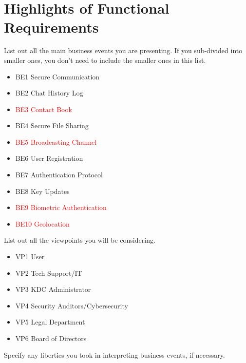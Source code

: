 \documentclass[]{article}
\begin{document}
\section{Highlights of Functional Requirements}
\label{sec:functional_requirements}

 List out all the main business events you are presenting. If you sub-divided into smaller ones, you don't need to include the smaller ones in this list.\\

\begin{itemize}
	\item BE1 Secure Communication
	\item BE2 Chat History Log
	\item[\textcolor{red}{\textbullet}] \textcolor{red}{BE3 Contact Book}
	\item BE4 Secure File Sharing
	\item[\textcolor{red}{\textbullet}] \textcolor{red}{BE5 Broadcasting Channel}
	\item BE6 User Registration
	\item BE7 Authentication Protocol
	\item BE8 Key Updates
	\item[\textcolor{red}{\textbullet}] \textcolor{red}{BE9 Biometric Authentication}
	\item[\textcolor{red}{\textbullet}] \textcolor{red}{BE10 Geolocation}

\end{itemize}

 List out all the viewpoints you will be considering.\\

\begin{itemize}
	\item VP1 User
	\item 	VP2 Tech Support/IT
	\item 	VP3 KDC Administrator
	\item 	VP4 Security Auditors/Cybersecurity
	\item 	VP5 Legal Department
	\item 	VP6 Board of Directors


\end{itemize}

 Specify any liberties you took in interpreting business events, if necessary.\\
\end{document}
